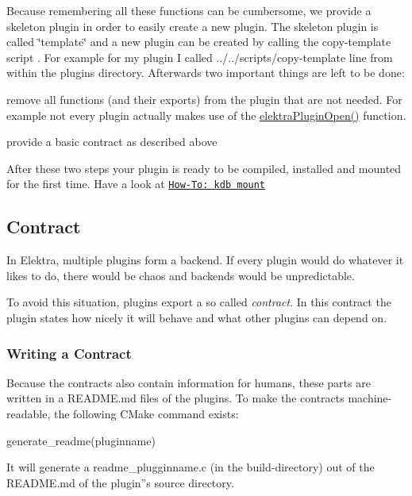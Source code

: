 Because remembering all these functions can be cumbersome, we provide a skeleton plugin in order to easily create a new plugin. The skeleton plugin is called \char`\"{}template\char`\"{} and a new plugin can be created by calling the copy-\/template script . For example for my plugin I called {\ttfamily ../../scripts/copy-\/template line} from within the plugins directory. Afterwards two important things are left to be done\+:


\begin{DoxyItemize}
\item remove all functions (and their exports) from the plugin that are not needed. For example not every plugin actually makes use of the {\ttfamily \hyperlink{elektra_2plugin_8c_a32a70a7876542c51d153164ac5108a57}{elektra\+Plugin\+Open()}} function.
\item provide a basic contract as described above
\end{DoxyItemize}

After these two steps your plugin is ready to be compiled, installed and mounted for the first time. Have a look at \href{http://community.libelektra.org/wp/?p=31}{\tt How-\/\+To\+: kdb mount}

\subsection*{Contract}

In Elektra, multiple plugins form a backend. If every plugin would do whatever it likes to do, there would be chaos and backends would be unpredictable.

To avoid this situation, plugins export a so called {\itshape contract}. In this contract the plugin states how nicely it will behave and what other plugins can depend on.

\subsubsection*{Writing a Contract}

Because the contracts also contain information for humans, these parts are written in a R\+E\+A\+D\+M\+E.\+md files of the plugins. To make the contracts machine-\/readable, the following C\+Make command exists\+: \begin{DoxyVerb}    generate_readme(pluginname)
\end{DoxyVerb}


It will generate a readme\+\_\+plugginname.\+c (in the build-\/directory) out of the R\+E\+A\+D\+M\+E.\+md of the plugin''s source directory.

